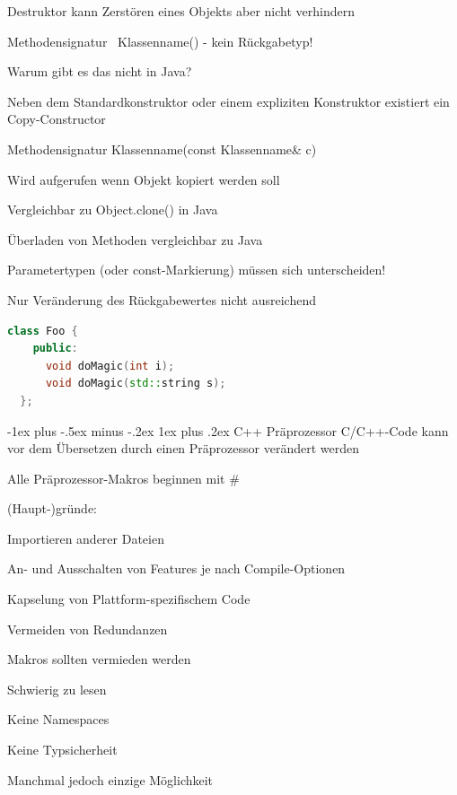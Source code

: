 \documentclass[10pt]{article}
\makeatletter
\renewcommand{\subsubsection}{\@startsection{subsubsection}{3}{0mm}%
                                {-1ex plus -.5ex minus -.2ex}%
                                {1ex plus .2ex}%
                                {\normalfont\small\bfseries}}
\makeatother
\begin{document}
\begin{itemize*}
\begin{itemize*}
\begin{itemize*}
      \item Destruktor kann Zerstören eines Objekts aber nicht verhindern
      \item Methodensignatur ~Klassenname() - kein Rückgabetyp!
      \item Warum gibt es das nicht in Java?
    \end{itemize*}
    \item Neben dem Standardkonstruktor oder einem expliziten Konstruktor existiert ein Copy-Constructor
    \begin{itemize*}
      \item Methodensignatur Klassenname(const Klassenname\& c)
      \item Wird aufgerufen wenn Objekt kopiert werden soll
      \item Vergleichbar zu Object.clone() in Java
    \end{itemize*}
  \end{itemize*}
  \item Überladen von Methoden vergleichbar zu Java
  \begin{itemize*}
    \item Parametertypen (oder const-Markierung) müssen sich unterscheiden!
    \item Nur Veränderung des Rückgabewertes nicht ausreichend
    \begin{lstlisting}[language=C++]
  class Foo {
    public:
      void doMagic(int i);
      void doMagic(std::string s);
  };
    \end{lstlisting}
  \end{itemize*}
\end{itemize*}

\subsubsection{C++ Präprozessor}
C/C++-Code kann vor dem Übersetzen durch einen Präprozessor verändert werden
\begin{itemize*}
  \item Alle Präprozessor-Makros beginnen mit \#
  \item (Haupt-)gründe:
  \begin{itemize*}
    \item Importieren anderer Dateien
    \item An- und Ausschalten von Features je nach Compile-Optionen
    \item Kapselung von Plattform-spezifischem Code
    \item Vermeiden von Redundanzen
  \end{itemize*}
  \item Makros sollten vermieden werden
  \begin{itemize*}
    \item Schwierig zu lesen
    \item Keine Namespaces
    \item Keine Typsicherheit
  \end{itemize*}
  \item Manchmal jedoch einzige Möglichkeit
\end{itemize*}
\end{document}
